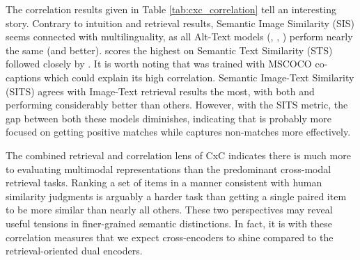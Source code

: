         The correlation results given in Table \ref{tab:cxc_correlation} tell an interesting story. Contrary to intuition and retrieval results,  Semantic Image Similarity (SIS) seems connected with multilinguality, as all Alt-Text models (\alignmling, \muralbase, \murallarge) perform nearly the same (and better).  \cxcbest scores the highest on Semantic Text Similarity (STS) followed closely by \murallarge. It is worth noting that \cxcbest was trained with MSCOCO co-captions which could explain its high correlation.
Semantic Image-Text Similarity (SITS) agrees with Image-Text retrieval results the most, with both \murallarge and \alignhuge performing considerably better than others. However, with the SITS metric, the gap between both these models diminishes, indicating that \alignhuge is probably more focused on getting positive matches while \murallarge captures non-matches more effectively.
        


        The combined retrieval and correlation lens of CxC indicates there is much more to evaluating multimodal representations than the predominant cross-modal retrieval tasks. Ranking a set of items in a manner consistent with human similarity judgments is arguably a harder task than getting a single paired item to be more similar than nearly all others. These two perspectives may reveal useful tensions in finer-grained semantic distinctions. In fact, it is with these correlation measures that we expect cross-encoders to shine compared to the retrieval-oriented dual encoders.